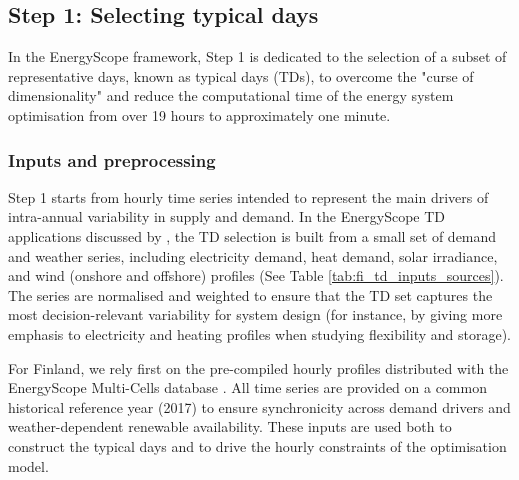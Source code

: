 \documentclass{article}
\begin{document}
\subsection{Step 1: Selecting typical days}
In the EnergyScope framework, Step 1 is dedicated to the selection of a subset of representative days, known as typical days (TDs), to overcome the "curse of dimensionality" and reduce the computational time of the energy system optimisation from over 19 hours to approximately one minute.

\subsubsection{Inputs and preprocessing}
Step 1 starts from hourly time series intended to represent the main drivers of intra-annual variability in supply and demand. In the EnergyScope TD applications discussed by \citet{limpens_generating_2021}, the TD selection is built from a small set of demand and weather series, including electricity demand, heat demand, solar irradiance, and wind (onshore and offshore) profiles (See Table \ref{tab:fi_td_inputs_sources}). The series are normalised and weighted to ensure that the TD set captures the most decision-relevant variability for system design (for instance, by giving more emphasis to electricity and heating profiles when studying flexibility and storage).


For Finland, we rely first on the pre-compiled hourly profiles distributed with the EnergyScope Multi-Cells database \cite{thiran_exploring_2025}. All time series are provided on a common historical reference year (2017) to ensure synchronicity across demand drivers and weather-dependent renewable availability. These inputs are used both to construct the typical days and to drive the hourly constraints of the optimisation model.
\end{document}
